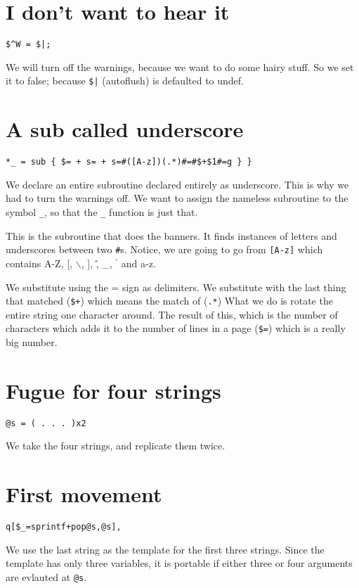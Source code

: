 \documentclass{article}
\begin{document}
\section{I don't want to hear it}
\begin{verbatim}
$^W = $|;
\end{verbatim}
We will turn off the warnings, because we want to do some hairy stuff.
So we set it to false; because \verb"$|" (autoflush) is defaulted to undef.

\section{A sub called underscore}
\begin{verbatim}
*_ = sub { $= + s= + s=#([A-z])(.*)#=#$+$1#=g } }
\end{verbatim}

We declare an entire subroutine declared entirely as underscore.  This
is why we had to turn the warnings off.  We want to assign the nameless
subroutine to the symbol \verb"_", so that the \verb"_" function is just that.

This is the subroutine that does the banners.  It finds instances of
letters and underscores between two \verb"#"s.  Notice, we are going to
go from \verb"[A-z]"
which contains \textsf{A-Z}, \textsf[, $\mathsf\backslash$, \textsf],
\textsf\^, \textsf\_, $\mathsf{^{\backprime}}$ and \textsf{a-z}.

We substitute using the = sign as delimiters.  We substitute with the
last thing that matched (\verb"$+") which means the match of (\verb".*")  
What we do
is rotate the entire string one character around.  The result of this,
which is the number of characters which adds it to the number of lines
in a page (\verb"$=") which is a really big number.

\section{Fugue for four strings}
\begin{verbatim}
@s = ( . . . )x2
\end{verbatim}
We take the four strings, and replicate them twice.

\section{First movement}
\begin{verbatim}
q[$_=sprintf+pop@s,@s],
\end{verbatim}
We use the last string as the template for the first three strings.
Since the template has only three variables, it is portable if either
three or four arguments are evlauted at \verb"@s".
\end{document}
